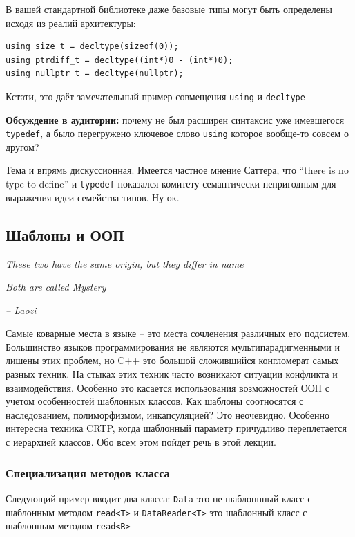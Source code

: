 \documentclass[a4paper,12pt,oneside]{article}
\begin{document}
В вашей стандартной библиотеке даже базовые типы могут быть определены исходя из реалий архитектуры:

\begin{lstlisting}
using size_t = decltype(sizeof(0));
using ptrdiff_t = decltype((int*)0 - (int*)0);
using nullptr_t = decltype(nullptr);
\end{lstlisting}

Кстати, это даёт замечательный пример совмещения \lstinline!using! и \lstinline!decltype!

\textbf{Обсуждение в аудитории:} почему не был расширен синтаксис уже имевшегося \lstinline!typedef!, а было перегружено ключевое слово \lstinline!using! которое вообще-то совсем о другом?

Тема и впрямь дискуссионная. Имеется частное мнение Саттера, что ``there is no type to define'' и \lstinline!typedef! показался комитету семантически непригодным для выражения идеи семейства типов. Ну ок.

\pagebreak
\subsection{Шаблоны и ООП}\label{OOTemplates}

\hfill\textit{These two have the same origin, but they differ in name}

\hfill\textit{Both are called Mystery}{\vspace{0.5em}}

\hfill\textit{-- Laozi}

Самые коварные места в языке -- это места сочленения различных его подсистем. Большинство языков программирования не являются мультипарадигменными и лишены этих проблем, но C++ это большой сложившийся конгломерат самых разных техник. На стыках этих техник часто возникают ситуации конфликта и взаимодействия. Особенно это касается использования возможностей ООП с учетом особенностей шаблонных классов. Как шаблоны соотносятся с наследованием, полиморфизмом, инкапсуляцией? Это неочевидно. Особенно интересна техника CRTP, когда шаблонный параметр причудливо переплетается с иерархией классов. Обо всем этом пойдет речь в этой лекции.

\subsubsection{Специализация методов класса}\label{MemberSpec}

Следующий пример вводит два класса: \lstinline!Data! это не шаблоннный класс с шаблонным методом \lstinline!read<T>! и \lstinline!DataReader<T>! это шаблонный класс с шаблонным методом \lstinline!read<R>!
\end{document}

